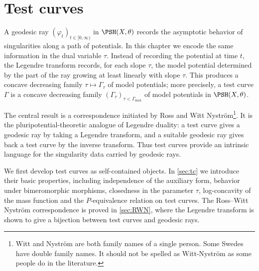 \chapter{Test curves}
\label{chap:testcurve}

A geodesic ray $(\varphi_t)_{t\in[0,\infty)}$ in $\PSH(X,\theta)$ records the asymptotic behavior of singularities along a path of potentials. In this chapter we encode the same information in the dual variable $\tau$. Instead of recording the potential at time $t$, the Legendre transform records, for each slope $\tau$, the model potential determined by the part of the ray growing at least linearly with slope $\tau$. This produces a concave decreasing family $\tau\mapsto\Gamma_\tau$ of model potentials; more precisely, a test curve $\Gamma$ is a concave decreasing family $(\Gamma_\tau)_{\tau<\Gamma_{\max}}$ of model potentials in $\PSH(X,\theta)$.

The central result is a correspondence initiated by Ross and Witt Nystr\"om\footnote{Witt and Nystr\"om are both family names of a single person. Some Swedes have double family names. It should not be spelled as Witt-Nystr\"om as some people do in the literature.}. It is the pluripotential-theoretic analogue of Legendre duality: a test curve gives a geodesic ray by taking a Legendre transform, and a suitable geodesic ray gives back a test curve by the inverse transform. Thus test curves provide an intrinsic language for the singularity data carried by geodesic rays.

We first develop test curves as self-contained objects. In \cref{sec:tc} we introduce their basic properties, including independence of the auxiliary form, behavior under bimeromorphic morphisms, closedness in the parameter $\tau$, log-concavity of the mass function and the $P$-equivalence relation on test curves. The Ross--Witt Nystr\"om correspondence is proved in \cref{sec:RWN}, where the Legendre transform is shown to give a bijection between test curves and geodesic rays.

